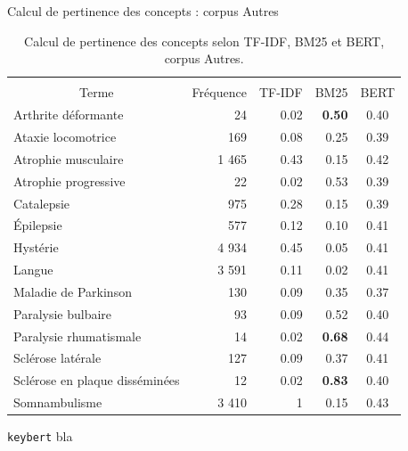 \begin{frame}{Calcul de pertinence des concepts : corpus \og{}Autres\fg{}}
    \footnotesize
\begin{table}[]
\begin{tabular}{|l|cccc|}
\hline
\multicolumn{1}{|c|}{{ }} &
  \multicolumn{4}{c|}{\cellcolor[HTML]{DAE8FC}{ Corpus \og{}Autres\fg{}}} \\ \cline{2-5} 
\multicolumn{1}{|c|}{\multirow{}{}{{Terme}}} &
  {Fréquence} &
  {TF-IDF} &
  {BM25} &
  {BERT} \\ \hline
{Arthrite déformante} &
  \multicolumn{1}{|r|}{{24}} &
  \multicolumn{1}{|r|}{{0.02}} &
  \multicolumn{1}{|r|}{{\textbf{0.50}}} &
  {0.40} \\ \hline
{Ataxie locomotrice} &
  \multicolumn{1}{|r|}{{169}} &
  \multicolumn{1}{|r|}{{0.08}} &
  \multicolumn{1}{|r|}{{0.25}} &
  {0.39} \\ \hline
{Atrophie musculaire} &
  \multicolumn{1}{|r|}{{1 465}} &
  \multicolumn{1}{|r|}{{0.43}} &
  \multicolumn{1}{|r|}{{0.15}} &
  {0.42} \\ \hline
{Atrophie progressive} &
  \multicolumn{1}{|r|}{{22}} &
  \multicolumn{1}{|r|}{{0.02}} &
  \multicolumn{1}{|r|}{{0.53}} &
  {0.39} \\ \hline
{Catalepsie} &
  \multicolumn{1}{|r|}{{975}} &
  \multicolumn{1}{|r|}{{0.28}} &
  \multicolumn{1}{|r|}{{0.15}} &
  {0.39} \\ \hline
{Épilepsie} &
  \multicolumn{1}{|r|}{{577}} &
  \multicolumn{1}{|r|}{{0.12}} &
  \multicolumn{1}{|r|}{{0.10}} &
  {0.41} \\ \hline
{Hystérie} &
  \multicolumn{1}{|r|}{{4 934}} &
  \multicolumn{1}{|r|}{{0.45}} &
  \multicolumn{1}{|r|}{{0.05}} &
  {0.41} \\ \hline
{Langue} &
  \multicolumn{1}{|r|}{{3 591}} &
  \multicolumn{1}{|r|}{{0.11}} &
  \multicolumn{1}{|r|}{{0.02}} &
  {0.41} \\ \hline
{Maladie de Parkinson} &
  \multicolumn{1}{|r|}{{130}} &
  \multicolumn{1}{|r|}{{0.09}} &
  \multicolumn{1}{|r|}{{0.35}} &
  {0.37} \\ \hline
{Paralysie bulbaire} &
  \multicolumn{1}{|r|}{{93}} &
  \multicolumn{1}{|r|}{{0.09}} &
  \multicolumn{1}{|r|}{{0.52}} &
  {0.40} \\ \hline
{Paralysie rhumatismale} &
  \multicolumn{1}{|r|}{{14}} &
  \multicolumn{1}{|r|}{{0.02}} &
  \multicolumn{1}{|r|}{{\textbf{0.68}}} &
  {0.44} \\ \hline
{Sclérose latérale} &
  \multicolumn{1}{|r|}{{127}} &
  \multicolumn{1}{|r|}{{0.09}} &
  \multicolumn{1}{|r|}{{0.37}} &
  {0.41} \\ \hline
{Sclérose en plaque disséminées} &
  \multicolumn{1}{|r|}{{12}} &
  \multicolumn{1}{|r|}{{0.02}} &
  \multicolumn{1}{|r|}{{\textbf{0.83}}} &
  {0.40} \\ \hline
{Somnambulisme} &
  \multicolumn{1}{|r|}{{3 410}} &
  \multicolumn{1}{|r|}{{1}} &
  \multicolumn{1}{|r|}{{0.15}} &
  {0.43} \\ \hline
\end{tabular}
\caption{Calcul de pertinence des concepts selon TF-IDF, BM25 et BERT, corpus \og{}Autres\fg{}.}
\end{table}
\end{frame}

\begin{frame}{\texttt{keybert}}
bla
\end{frame}
